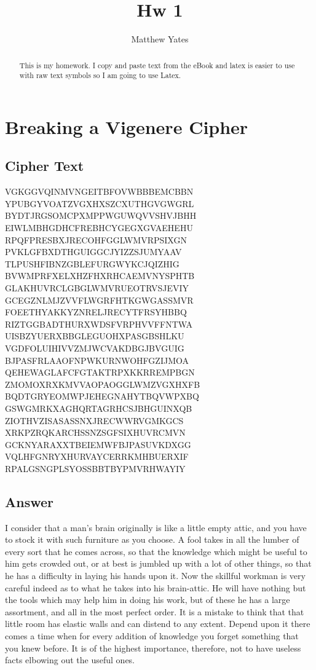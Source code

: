 \documentclass[10pt]{article}
\title{Hw 1}
\author{Matthew Yates}
\begin{document}
\maketitle

\begin{abstract}
	This is my homework. I copy and paste text from the eBook and latex is easier to use
	with raw text symbols so I am going to use Latex.
\end{abstract}

\section{Breaking a Vigenere Cipher}
\subsection{Cipher Text}

VGKGGVQINMVNGEITBFOVWBBBEMCBBN
YPUBGYVOATZVGXHXSZCXUTHGVGWGRL
BYDTJRGSOMCPXMPPWGUWQVVSHVJBHH
EIWLMBHGDHCFREBHCYGEGXGVAEHEHU
RPQFPRESBXJRECOHFGGLWMVRPSIXGN
PVKLGFBXDTHGUIGGCJYIZZSJUMYAAV
TLPUSHFIBNZGBLEFURGWYKCJQIZHIG
BVWMPRFXELXHZFHXRHCAEMVNYSPHTB
GLAKHUVRCLGBGLWMVRUEOTRVSJEVIY
GCEGZNLMJZVVFLWGRFHTKGWGASSMVR
FOEETHYAKKYZNRELJRECYTFRSYHBBQ
RIZTGGBADTHURXWDSFVRPHVVFFNTWA
UISBZYUERXBBGLEGUOHXPASGBSHLKU
VGDFOLUIHIVVZMJWCVAKDBGJBVGUIG
BJPASFRLAAOFNPWKURNWOHFGZIJMOA
QEHEWAGLAFCFGTAKTRPXKKRREMPBGN
ZMOMOXRXKMVVAOPAOGGLWMZVGXHXFB
BQDTGRYEOMWPJEHEGNAHYTBQVWPXBQ
GSWGMRKXAGHQRTAGRHCSJBHGUINXQB
ZIOTHVZISASASSNXJRECWWRVGMKGCS
XRKPZRQKARCHSSNZSGFSIXHUVRCMVN
GCKNYARAXXTBEIEMWFBJPASUVKDXGG
VQLHFGNRYXHURVAYCERRKMHBUERXIF
RPALGSNGPLSYOSSBBTBYPMVRHWAYIY

\subsection{Answer}
I consider that a man's brain originally is like a little empty attic, 
and you have to stock it with such furniture as you choose. A fool takes 
in all the lumber of every sort that he comes across, so that the knowledge
which might be useful to him gets crowded out, or at best is jumbled
up with a lot of other things, so that he has a difficulty in laying his 
hands upon it. Now the skillful workman is very careful indeed as to what
he takes into his brain-attic. He will have nothing but the tools which
may help him in doing his work, but of these he has a large assortment,
and all in the most perfect order. It is a mistake to think that that
little room has elastic walls and can distend to any extent. Depend 
upon it there comes a time when for every addition of knowledge you forget 
something that you knew before. It is of the highest importance, 
therefore, not to have useless facts elbowing out the useful ones.
\end{document}
